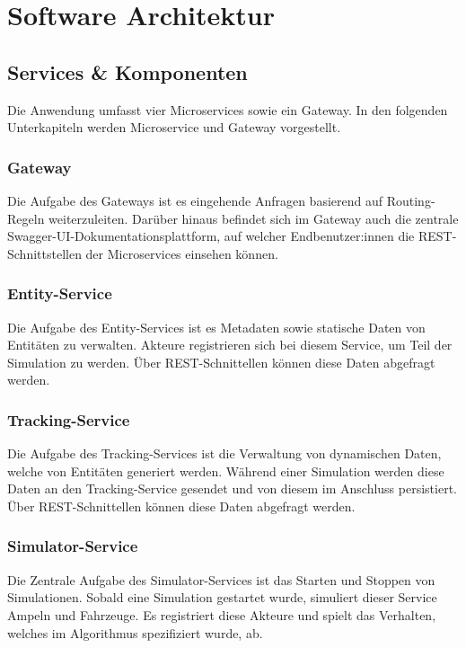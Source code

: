 \section{Software Architektur}

\subsection{Services \& Komponenten}

Die Anwendung umfasst vier Microservices sowie ein Gateway.
In den folgenden Unterkapiteln werden Microservice und Gateway vorgestellt.

\subsubsection{Gateway}

Die Aufgabe des Gateways ist es eingehende Anfragen basierend auf Routing-Regeln weiterzuleiten.
Darüber hinaus befindet sich im Gateway auch die zentrale Swagger-UI-Dokumentationsplattform, auf welcher Endbenutzer:innen die REST-Schnittstellen der Microservices einsehen können.

\subsubsection{Entity-Service}

Die Aufgabe des Entity-Services ist es Metadaten sowie statische Daten von Entitäten zu verwalten.
Akteure registrieren sich bei diesem Service, um Teil der Simulation zu werden.
Über REST-Schnittellen können diese Daten abgefragt werden.

\subsubsection{Tracking-Service}

Die Aufgabe des Tracking-Services ist die Verwaltung von dynamischen Daten, welche von Entitäten generiert werden.
Während einer Simulation werden diese Daten an den Tracking-Service gesendet und von diesem im Anschluss persistiert.
Über REST-Schnittellen können diese Daten abgefragt werden.

\subsubsection{Simulator-Service}

Die Zentrale Aufgabe des Simulator-Services ist das Starten und Stoppen von Simulationen.
Sobald eine Simulation gestartet wurde, simuliert dieser Service Ampeln und Fahrzeuge.
Es registriert diese Akteure und spielt das Verhalten, welches im Algorithmus spezifiziert wurde, ab.


